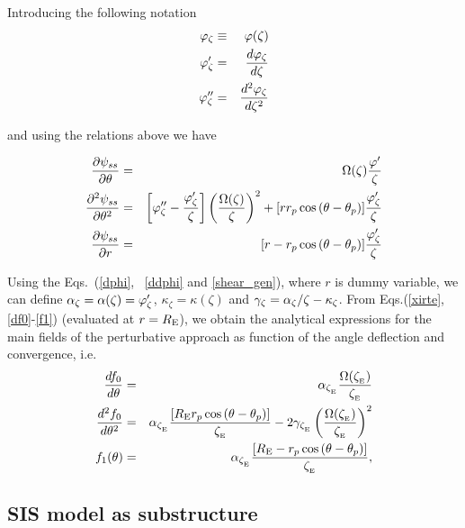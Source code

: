 Introducing the following notation
\begin{eqnarray}
\varphi_\zeta & \equiv & \varphi(\zeta) \nonumber \\
\varphi^\prime_\zeta &=& d\varphi_\zeta \over d\zeta \nonumber  \\
\varphi^{\prime\prime}_\zeta &=& d^2\varphi_\zeta \over d\zeta^2 \nonumber 
\end{eqnarray}

and using the relations above we have

\begin{eqnarray}
\dfrac{\prtl \psi_{ss}}{\prtl \te}&=&\Omega(\zeta)\dfrac{\varphi^\prime}{\zeta}\label{df0}\\
\dfrac{\prtl^2 \psi_{ss}}{\prtl\te^2}&=&\left[\varphi^{\prime\prime}_\zeta-\dfrac{\varphi^\prime_\zeta}{\zeta}\right]%
\left(\dfrac{\Omega(\zeta)}{\zeta}\right)^2+[r r_p\cos{(\te-\tep)}]\dfrac{\varphi^\prime_\zeta}{\zeta}\label{ddf0}\\
\dfrac{\prtl \psi_{ss}}{\prtl r}&=&[r-r_p\cos{(\te-\tep)}]\dfrac{\varphi^\prime_\zeta}{\zeta}\label{f1}
\end{eqnarray}

Using the Eqs.~(\ref{dphi}, \, \ref{ddphi} and \ref{shear_gen}), where $r$ is dummy variable, we can define 
$\alpha_\zeta=\alpha(\zeta)=\varphi^\prime_\zeta$, $\kappa_\zeta=\kappa(\zeta)$ and $\gamma_\zeta=\alpha_\zeta/\zeta-\kappa_\zeta$. 
From Eqs.(\ref{xirte}, \ref{df0}-\ref{f1}) (evaluated at $r=R_{\mathrm{E}}$), we obtain the analytical expressions for the main fields of
the perturbative approach as function of the angle deflection and convergence, i.e.
\begin{eqnarray}
\dfrac{df_0}{d\te}&=&\al_{\xie}\dfrac{\Omega(\xie)}{\xie}\\
\dfrac{d^2f_0}{d\te^2}&=& \al_{\xie}\dfrac{[\re r_p\cos{(\te-\tep)}]}{\xie}%
- 2\gamma_{\xie} \left(\dfrac{\Omega(\xie)}{\xie}\right)^2\\
f_1(\te)&=&\al_{\xie}\dfrac{[\re-r_p\cos{(\te-\tep)}]}{\xie},
\end{eqnarray}

\subsection{SIS model as substructure}


